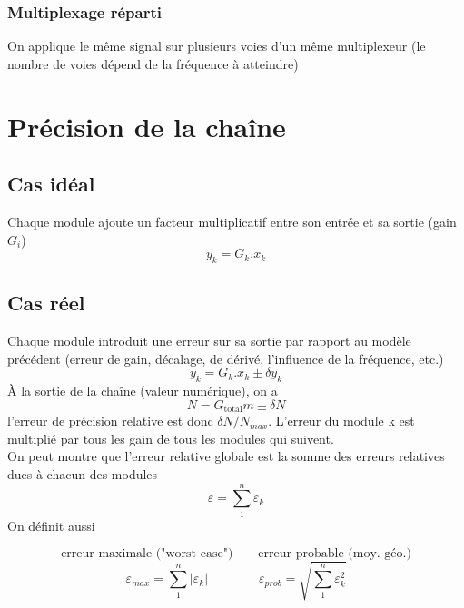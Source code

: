 \subsubsection{Multiplexage réparti}
On applique le même signal sur plusieurs voies d'un même multiplexeur (le nombre de voies dépend de la fréquence à atteindre)
\section{Précision de la chaîne}
\subsection{Cas idéal}
Chaque module ajoute un facteur multiplicatif entre son entrée et sa sortie (gain \(G_i\))
\[y_k=G_k.x_k\]
\subsection{Cas réel}
Chaque module introduit une erreur sur sa sortie par rapport au modèle précédent (erreur de gain, décalage, de dérivé, l'influence de la fréquence, etc.)
\[y_k=G_k.x_k\pm \delta y_k\]
À la sortie de la chaîne (valeur numérique), on a
\[N=G_{\text{total}}m\pm\delta N\]
l'erreur de précision relative est donc \(\delta N/N_{max}\). L'erreur du module k est multiplié par tous les gain de tous les modules qui suivent.\\
On peut montre que l'erreur relative globale est la somme des erreurs relatives dues à chacun des modules
\[\varepsilon=\sum_1^n\varepsilon_k\]
On définit aussi

\[\text{erreur maximale ("worst case")}\qquad\text{erreur probable (moy. géo.)}\]
\[\varepsilon_{max}=\sum_1^n|\varepsilon_k|\qquad\qquad\varepsilon_{prob}=\sqrt{\sum_1^n\varepsilon_k^2}\]
